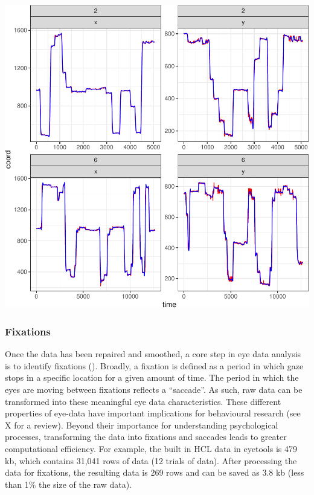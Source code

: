 \documentclass[
  man,
  floatsintext,
  longtable,
  nolmodern,
  notxfonts,
  notimes,
  colorlinks=true,linkcolor=blue,citecolor=blue,urlcolor=blue]{apa7}
\begin{document}
\includegraphics{BRM_ms_files/figure-pdf/unnamed-chunk-6-1.pdf}

\subsubsection{Fixations}\label{fixations}

Once the data has been repaired and smoothed, a core step in eye data
analysis is to identify fixations
().
Broadly, a fixation is defined as a period in which gaze stops in a
specific location for a given amount of time. The period in which the
eyes are moving between fixations reflects a ``saccade''. As such, raw
data can be transformed into these meaningful eye data characteristics.
These different properties of eye-data have important implications for
behavioural research (see X for a review). Beyond their importance for
understanding psychological processes, transforming the data into
fixations and saccades leads to greater computational efficiency. For
example, the built in HCL data in eyetools is 479 kb, which contains
31,041 rows of data (12 trials of data). After processing the data for
fixations, the resulting data is 269 rows and can be saved as 3.8 kb
(less than 1\% the size of the raw data).
\end{document}
